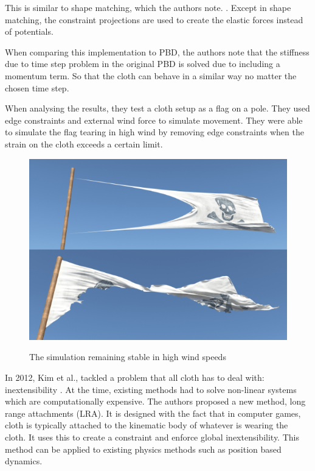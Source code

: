 \documentclass[12pt,a4paper]{article}
\begin{document}
This is similar to shape matching, which the authors note. \cite{ogshapematching}. Except in shape matching, the constraint projections are used to create the elastic forces instead of potentials.

When comparing this implementation to PBD, the authors note that the stiffness due to time step problem in the original PBD is solved due to including a momentum term. So that the cloth can behave in a similar way no matter the chosen time step.

When analysing the results, they test a cloth setup as a flag on a pole. They used edge constraints and external wind force to simulate movement. They were able to simulate the flag tearing in high wind by removing edge constraints when the strain on the cloth exceeds a certain limit.
\begin{figure}[h]
	\centering
	\caption{The simulation remaining stable in high wind speeds}
	\includegraphics[scale=0.5]{PDFlag.png}
	\label{fig:pd}
\end{figure}

In 2012, Kim et al., tackled a problem that all cloth has to deal with: inextensibility \cite{longrange}. At the time, existing methods had to solve non-linear systems which are computationally expensive. The authors proposed a new method, long range attachments (LRA). It is designed with the fact that in computer games, cloth is typically attached to the kinematic body of whatever is wearing the cloth. It uses this to create a constraint and enforce global inextensibility. This method can be applied to existing physics methods such as position based dynamics.\\
\end{document}
